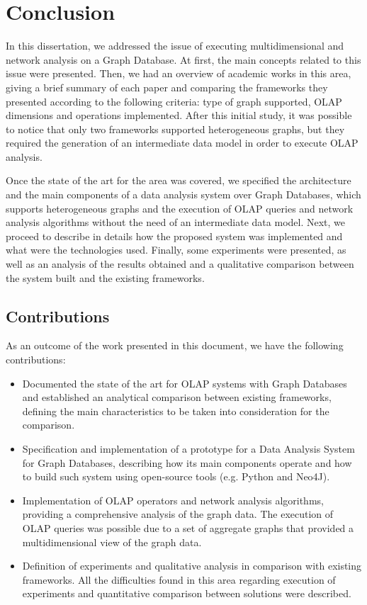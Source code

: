 \chapter{Conclusion}

In this dissertation, we addressed the issue of executing multidimensional and network analysis on a Graph Database. At first, the main concepts related to this issue were presented. Then, we had an overview of academic works in this area, giving a brief summary of each paper and comparing the frameworks they presented according to the following criteria: type of graph supported, OLAP dimensions and operations implemented. After this initial study, it was possible to notice that only two frameworks supported heterogeneous graphs, but they required the generation of an intermediate data model in order to execute OLAP analysis.

Once the state of the art for the area was covered, we specified the architecture and the main components of a data analysis system over Graph Databases, which supports heterogeneous graphs and the execution of OLAP queries and network analysis algorithms without the need of an intermediate data model. Next, we proceed to describe in details how the proposed system was implemented and what were the technologies used. Finally, some experiments were presented, as well as an analysis of the results obtained and a qualitative comparison between the system built and the existing frameworks. 

\section{Contributions}
As an outcome of the work presented in this document, we have the following contributions:
\begin{itemize}
\item Documented the state of the art for OLAP systems with Graph Databases and established an analytical comparison between existing frameworks, defining the main characteristics to be taken into consideration for the comparison.
\item Specification and implementation of a prototype for a Data Analysis System for Graph Databases, describing how its main components operate and how to build such system using open-source tools (e.g. Python and Neo4J).
\item Implementation of OLAP operators and network analysis algorithms, providing a comprehensive analysis of the graph data. The execution of OLAP queries was possible due to a set of aggregate graphs that provided a multidimensional view of the graph data.
\item Definition of experiments and qualitative analysis in comparison with existing frameworks. All the difficulties found in this area regarding execution of experiments and quantitative comparison between solutions were described.
\end{itemize}


